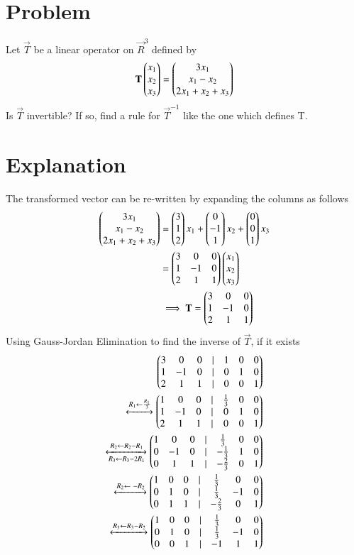 \documentclass[journal,12pt,twocolumn]{IEEEtran}
\begin{document}
\section{Problem}
Let $\vec{T}$ be a linear operator on $\vec{R}^3$ defined by
\begin{align*}
	\mathbf{T}\begin{pmatrix}x_1\\x_2\\x_3\end{pmatrix}=\begin{pmatrix}3x_1\\x_1-x_2\\2x_1+x_2+x_3\end{pmatrix}
\end{align*}
Is $\vec{T}$ invertible? If so, find a rule for $\vec{T}^{-1}$ like the one which defines T.
\section{Explanation}
The transformed vector can be re-written by expanding the columns as follows
\begin{align}
	\begin{pmatrix}3x_1\\x_1-x_2\\2x_1+x_2+x_3\end{pmatrix}
	&=\begin{pmatrix}3\\1\\2\end{pmatrix}x_1+\begin{pmatrix}0\\-1\\1\end{pmatrix}x_2+\begin{pmatrix}0\\0\\1\end{pmatrix}x_3\\
	&=\begin{pmatrix}3&0&0\\
		 1&-1&0\\
		 2&1&1\end{pmatrix}\begin{pmatrix}x_1\\x_2\\x_3\end{pmatrix} \\
	&\implies \mathbf{T}=\begin{pmatrix}3&0&0\\
                 1&-1&0\\
                 2&1&1\end{pmatrix}
\end{align}
Using Gauss-Jordan Elimination to find the inverse of $\vec{T}$, if it exists
\begin{align}
	\begin{pmatrix}3&0&0&|&1&0&0\\
	       1&-1&0&|&0&1&0\\
	       2&1&1&|&0&0&1\end{pmatrix}\\
	\xleftrightarrow[]{R_1\leftarrow\frac{R_1}{3}}
	\begin{pmatrix}1&0&0&|&\frac{1}{3}&0&0\\
               1&-1&0&|&0&1&0\\
               2&1&1&|&0&0&1\end{pmatrix}\\
	\xleftrightarrow[R_3\leftarrow R_3-2R_1]{R_2\leftarrow R_2-R_1}
	\begin{pmatrix}1&0&0&|&\frac{1}{3}&0&0\\
	       0&-1&0&|&-\frac{1}{3}&1&0\\
	       0&1&1&|&-\frac{2}{3}&0&1\end{pmatrix}\\
        \xleftrightarrow[]{R_2\leftarrow \ -R_2}
	\begin{pmatrix}1&0&0&|&\frac{1}{3}&0&0\\
               0&1&0&|&\frac{1}{3}&-1&0\\
               0&1&1&|&-\frac{2}{3}&0&1\end{pmatrix}\\
        \xleftrightarrow[]{R_3\leftarrow R_3-R_2}
	\begin{pmatrix}1&0&0&|&\frac{1}{3}&0&0\\
               0&1&0&|&\frac{1}{3}&-1&0\\
               0&0&1&|&-1&1&1\end{pmatrix}
\end{align}
\end{document}
